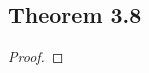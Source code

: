 \documentclass[../../main.tex]{subfiles}
\begin{document}
\subsection{Theorem 3.8}
\begin{wts}

\end{wts}
\begin{proof}

\end{proof}
\end{document}
